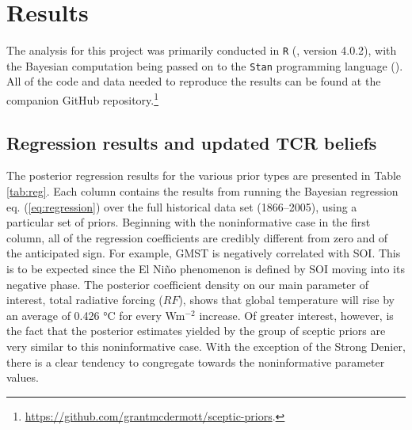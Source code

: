 \documentclass[smallextended]{svjour3}       %
\begin{document}
\hypertarget{sec:results}{%
\section{Results}\label{sec:results}}

The analysis for this project was primarily conducted in \texttt{R}
(\cite{rcore}, version 4.0.2), with the Bayesian computation being
passed on to the \texttt{Stan} programming language (\cite{cmdstanr}).
All of the code and data needed to reproduce the results can be found at
the companion GitHub repository.\footnote{\url{https://github.com/grantmcdermott/sceptic-priors}.}

\hypertarget{sec:regression}{%
\subsection{Regression results and updated TCR
beliefs}\label{sec:regression}}

The posterior regression results for the various prior types are
presented in Table \ref{tab:reg}. Each column contains the results from
running the Bayesian regression eq. (\ref{eq:regression}) over the full
historical data set (1866--2005), using a particular set of priors.
Beginning with the noninformative case in the first column, all of the
regression coefficients are credibly different from zero and of the
anticipated sign. For example, GMST is negatively correlated with SOI.
This is to be expected since the El Niño phenomenon is defined by SOI
moving into its negative phase. The posterior coefficient density on our
main parameter of interest, total radiative forcing (\(RF\)), shows that
global temperature will rise by an average of 0.426 °C for every
Wm\(^{-2}\) increase. Of greater interest, however, is the fact that the
posterior estimates yielded by the group of sceptic priors are very
similar to this noninformative case. With the exception of the Strong
Denier, there is a clear tendency to congregate towards the
noninformative parameter values.
\end{document}
